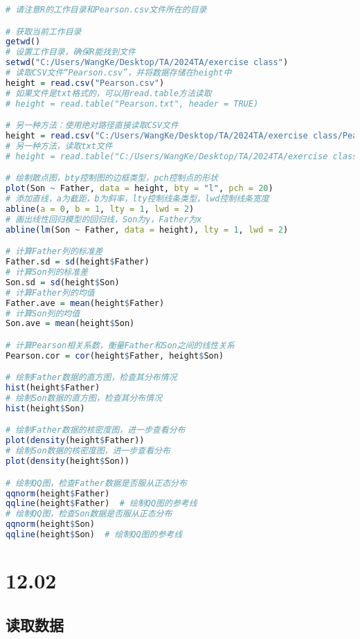 \documentclass[UTF8]{report}
\theoremstyle{MyLineTheoremStyle} %
\theoremstyle{MyBlockTheoremStyle} %
\theoremstyle{MySubsubsectionStyle} %
\begin{document}
\begin{lstlisting}[language=R]
    # 请注意R的工作目录和Pearson.csv文件所在的目录

# 获取当前工作目录
getwd()  
# 设置工作目录，确保R能找到文件
setwd("C:/Users/WangKe/Desktop/TA/2024TA/exercise class")  
# 读取CSV文件“Pearson.csv”，并将数据存储在height中
height = read.csv("Pearson.csv")  
# 如果文件是txt格式的，可以用read.table方法读取
# height = read.table("Pearson.txt", header = TRUE)

# 另一种方法：使用绝对路径直接读取CSV文件
height = read.csv("C:/Users/WangKe/Desktop/TA/2024TA/exercise class/Pearson.csv")  
# 另一种方法，读取txt文件
# height = read.table("C:/Users/WangKe/Desktop/TA/2024TA/exercise class/Pearson.txt", header = TRUE)

# 绘制散点图，bty控制图的边框类型，pch控制点的形状
plot(Son ~ Father, data = height, bty = "l", pch = 20)  
# 添加直线，a为截距，b为斜率，lty控制线条类型，lwd控制线条宽度
abline(a = 0, b = 1, lty = 1, lwd = 2)  
# 画出线性回归模型的回归线，Son为y，Father为x
abline(lm(Son ~ Father, data = height), lty = 1, lwd = 2)  

# 计算Father列的标准差
Father.sd = sd(height$Father)  
# 计算Son列的标准差
Son.sd = sd(height$Son)  
# 计算Father列的均值
Father.ave = mean(height$Father)  
# 计算Son列的均值
Son.ave = mean(height$Son)  

# 计算Pearson相关系数，衡量Father和Son之间的线性关系
Pearson.cor = cor(height$Father, height$Son)  

# 绘制Father数据的直方图，检查其分布情况
hist(height$Father)  
# 绘制Son数据的直方图，检查其分布情况
hist(height$Son)  

# 绘制Father数据的核密度图，进一步查看分布
plot(density(height$Father))  
# 绘制Son数据的核密度图，进一步查看分布
plot(density(height$Son))  

# 绘制QQ图，检查Father数据是否服从正态分布
qqnorm(height$Father)  
qqline(height$Father)  # 绘制QQ图的参考线
# 绘制QQ图，检查Son数据是否服从正态分布
qqnorm(height$Son)  
qqline(height$Son)  # 绘制QQ图的参考线

\end{lstlisting}

\section*{12.02}

\subsection*{读取数据}
\end{document}
